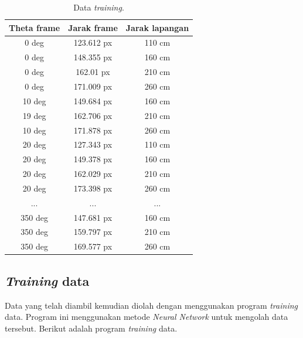 \begin{table}[htbp]
  \caption{Data \textit{training}.}
  \begin{center}
  \begin{tabular}{|c|c|c|}
    \hline
    \rowcolor[HTML]{C0C0C0}
    \textbf{Theta frame} & \textbf{Jarak frame} & \textbf{Jarak lapangan} \\
    \hline
    0 deg            & 123.612 px                & 110 cm            \\
    0 deg           & 148.355 px                & 160 cm            \\
    0 deg           & 162.01 px                & 210 cm            \\
    0 deg           & 171.009 px                & 260 cm           \\
    10 deg           & 149.684 px                & 160 cm           \\
    19 deg           & 162.706 px                & 210 cm           \\
    10 deg           & 171.878 px                & 260 cm           \\
    20 deg           & 127.343 px                & 110 cm           \\
    20 deg           & 149.378 px                & 160 cm           \\
    20 deg           & 162.029 px                & 210 cm           \\
    20 deg           & 173.398 px                & 260 cm           \\
    ...           & ...                & ...           \\
    350 deg           & 147.681 px                & 160 cm           \\
    350 deg           & 159.797 px                & 210 cm           \\
    350 deg           & 169.577 px                & 260 cm           \\
    \hline
  \end{tabular}
  \label{tab1}
  \end{center}
\end{table}


\subsection{\textit{Training} data
  \label{sec:trainingdata}}

Data yang telah diambil kemudian diolah dengan menggunakan program \textit{training} data. Program ini menggunakan metode \textit{Neural Network} untuk mengolah data tersebut. Berikut adalah program \textit{training} data. 

